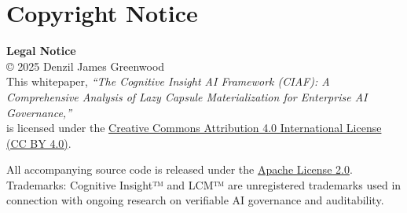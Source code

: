 \documentclass[12pt,a4paper]{article}
\begin{document}
\section*{Copyright Notice}

\begin{infobox}
\textbf{Legal Notice}\\
© 2025 Denzil James Greenwood \\
This whitepaper, \textit{``The Cognitive Insight AI Framework (CIAF): A Comprehensive Analysis of Lazy Capsule Materialization for Enterprise AI Governance,''} \\
is licensed under the \href{https://creativecommons.org/licenses/by/4.0/}{Creative Commons Attribution 4.0 International License (CC BY 4.0)}.

All accompanying source code is released under the \href{https://www.apache.org/licenses/LICENSE-2.0}{Apache License 2.0}. \\
Trademarks: Cognitive Insight™ and LCM™ are unregistered trademarks used in connection with ongoing research on verifiable AI governance and auditability.
\end{infobox}
\end{document}
